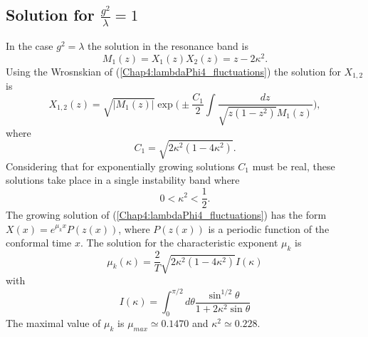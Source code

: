 \documentclass[11pt,a4paper,twoside]{book}
\begin{document}
\subsection{Solution for $ \frac{g^{2}}{\lambda}=1 $}
In the case $ g^{2}=\lambda $  the solution in the resonance band is 
\begin{equation}
\label{Chap4:lambdaPhi4_solution
Mz1}
M_{1}(z) = X_{1}(z)X_{2}(z) = z-2\kappa^{2}.
\end{equation}
Using the Wrosnskian of (\ref{Chap4:lambdaPhi4_fluctuations}) the solution for $ X_{1,2} $ is 
\begin{equation}
\label{Chap4:lambdaPhi4_fisrstSolution}
X_{1,2}(z)=\sqrt{|M_{1}(z)|}\exp\Bigg(\pm \frac{C_{1}}{2}\int \frac{dz}{\sqrt{z(1-z^{2})} M_{1}(z)}\Bigg),
\end{equation}
where
\begin{equation}
\label{Chap4:lambdaPhi4_C1}
C_{1}=\sqrt{2\kappa^{2}(1-4\kappa^{2})}.
\end{equation}
Considering that for exponentially growing solutions $ C_{1} $ must be real, these solutions take place in a single instability band where
\begin{equation}
\label{Chap4:lambdaPhi4_bandSolution1}
0 < \kappa^{2} < \frac{1}{2}.
\end{equation}
The growing solution of (\ref{Chap4:lambdaPhi4_fluctuations}) has the form $ X(x) = e^{\mu_{k} x}P(z(x)) $, where $ P(z(x)) $ is a periodic function of the conformal time $ x $. The solution for the characteristic exponent $ \mu_{k} $ is
\begin{equation}
\label{Chap4:lambdaPhi4_rateSolution1}
\mu_{k}(\kappa)=\frac{2}{T}\sqrt{2\kappa^{2}(1-4\kappa^{2})}I(\kappa)
\end{equation}
with
\begin{equation}
\label{Chap4:lambdaPhi4_auxiliaryFunction}
I(\kappa)=\int_{0}^{\pi/2} d\theta \frac{\sin^{1/2}\theta}{1+2\kappa^{2}\sin \theta}
\end{equation}
The maximal value of $ \mu_{k} $ is $\mu_{max} \simeq 0.1470$ and $\kappa^{2}\simeq 0.228$.
\end{document}
